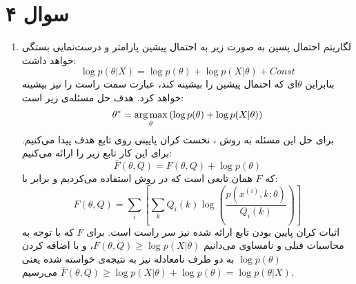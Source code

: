 \documentclass[a4paper, 12pt]{article}
\begin{document}
\section*{سوال ۴}
\begin{enumerate}
	\item
	لگاریتم احتمال پسین به صورت زیر به احتمال پیشین پارامتر و درست‌نمایی بستگی خواهد داشت:
	\[
	\log p(\theta|X) = \log p(\theta) + \log p(X|\theta) + Const
	\]
	بنابراین $\theta$ای که احتمال پیشین را بیشینه کند، عبارت سمت راست را نیز بیشینه خواهد کرد. هدف حل مسئله‌ی زیر است:
	\[
	\theta^\ast = \operatorname*{arg\,max}_\theta \left(\log p(\theta) + \log p(X|\theta) \right)
	\]
	برای حل این مسئله به روش ، نخست کران پایینی روی تابع هدف پیدا می‌کنیم. برای این کار تابع زیر را ارائه می‌کنیم:
	\[
	\bar{F}(\theta, Q) = F(\theta, Q) + \log p(\theta)
	\]
	که $F$ همان تابعی است که در روش  استفاده می‌کردیم و برابر با:
	\[
	F(\theta, Q) = \sum_i\left[\sum_k Q_i(k) \log \left(\frac{p(x^{(i)}, k; \theta)}{Q_i(k)}\right)\right]
	\]
	اثبات کران پایین بودن تابع ارائه شده نیز سر راست است. برای $F$ که با توجه به محاسبات قبلی و نامساوی  می‌دانیم
	$F(\theta, Q) \ge \log p(X|\theta)$،
	و با اضافه کردن
	$\log p(\theta)$
	به دو طرف نامعادله نیز به نتیجه‌ی خواسته شده یعنی
	$\bar{F}(\theta, Q) \ge \log p(X|\theta) + \log p(\theta) = \log p(\theta|X)$
	می‌رسیم.
	

\end{enumerate}
\end{document}
